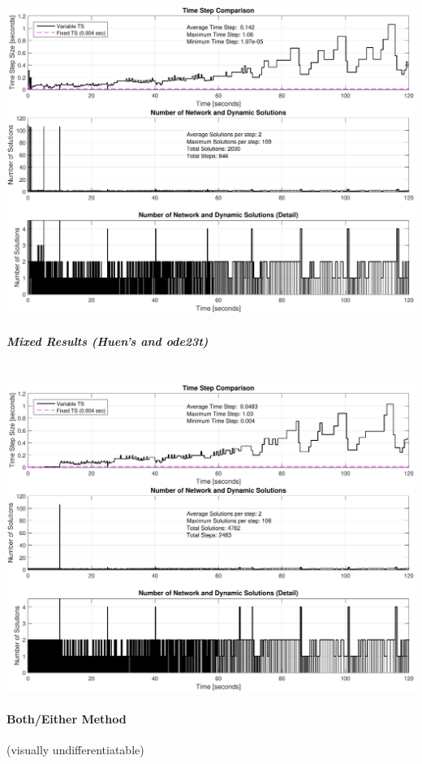 \documentclass[12pt]{article}
\begin{document}
\includegraphics[width=\linewidth]{AGCsteps2}

\pagebreak
\subparagraph{Mixed Results (Huen's and ode23t)} \ \\

\includegraphics[width=\linewidth]{AGCsteps}

\pagebreak
\paragraph{Both/Either Method} (visually undifferentiatable) \ \\
\end{document}
